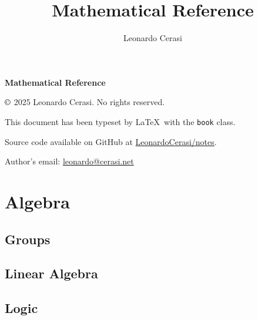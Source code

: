 \documentclass[a4paper, 12pt]{book}
\title{\Huge \sffamily \textbf{Mathematical Reference}}
\author{Leonardo Cerasi}
\date{}
\begin{document}
\frontmatter

\maketitle

\begin{documentinfo}
  \textbf{Mathematical Reference}

  \vspace{0.75em}

  $ \copyright $ 2025 Leonardo Cerasi. No rights reserved.

  \vspace{0.75em}

  This document has been typeset by \LaTeX\ with the \texttt{book} class.

  Source code available on GitHub at \href{https://github.com/LeonardoCerasi/notes}{\ttfamily LeonardoCerasi/notes}.

  \vspace{0.75em}

  Author's email: \href{mailto:leonardo@cerasi.net}{\ttfamily leonardo@cerasi.net}
\end{documentinfo}


\toc

\pagestyle{contents}

\mainmatter

\part{Algebra}
\pagestyle{body}

\chapter{Groups}


\chapter{Linear Algebra}


\begin{appendices}
\pagestyle{append}

\chapter{Logic}


\clearpage
\end{appendices}


\pagestyle{biblio}
\printbibliography[heading = bibintoc, title = {Bibliography}]
\restoregeometry
\end{document}
